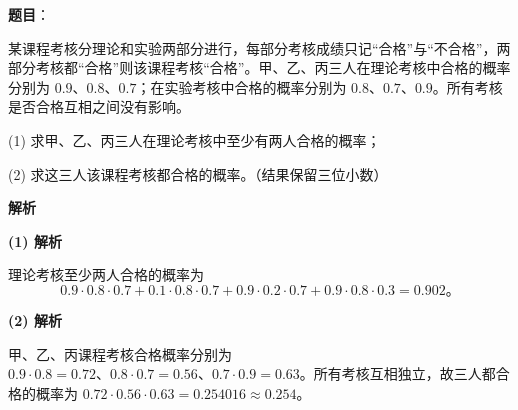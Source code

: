 \begin{answer}

\textbf{题目}：

某课程考核分理论和实验两部分进行，每部分考核成绩只记“合格”与“不合格”，两部分考核都“合格”则该课程考核“合格”。甲、乙、丙三人在理论考核中合格的概率分别为 $0.9\text{、}0.8\text{、}0.7$；在实验考核中合格的概率分别为 $0.8\text{、}0.7\text{、}0.9$。所有考核是否合格互相之间没有影响。

(1) 求甲、乙、丙三人在理论考核中至少有两人合格的概率；

(2) 求这三人该课程考核都合格的概率。（结果保留三位小数）

\textbf{解析}

\textbf{(1) 解析}

理论考核至少两人合格的概率为
\nopagebreak[4]
\[
0.9\cdot0.8\cdot0.7+0.1\cdot0.8\cdot0.7+0.9\cdot0.2\cdot0.7+0.9\cdot0.8\cdot0.3=0.902\mbox{。}
\]

\textbf{(2) 解析}

甲、乙、丙课程考核合格概率分别为 $0.9\cdot0.8=0.72\text{、}0.8\cdot0.7=0.56\text{、}0.7\cdot0.9=0.63$。所有考核互相独立，故三人都合格的概率为 $0.72\cdot0.56\cdot0.63=0.254016\approx0.254$。



\end{answer}
